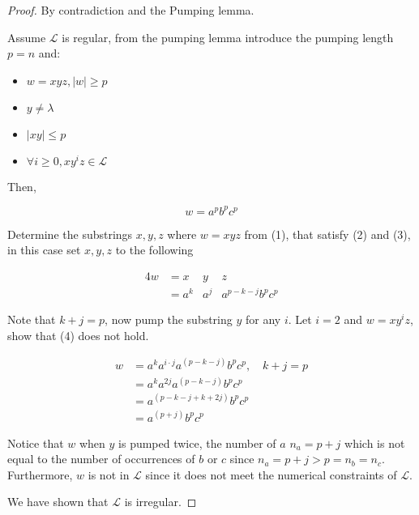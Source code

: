 \begin{proof}
    By contradiction and the Pumping lemma.

    Assume $\mathcal{L}$ is regular, from the pumping lemma introduce the pumping length $p=n$ and:
    \begin{itemize}
        \item $w=xyz, |w| \geq p$
        \item $y\neq \lambda$
        \item $|xy|\leq p$
        \item $\forall i\geq 0, xy^iz\in \mathcal{L}$
    \end{itemize}

    Then,
    
    \[
        w = a^p b^p c^p
    \]

    Determine the substrings $x,y,z$ where $w=xyz$ from (1), that satisfy (2) and (3), in this case set $x,y,z$ to the following
    
    \begin{alignat*}{4}
    w & = x &y & z \\
      & = a^k &a^j & a^{p-k-j}b^pc^p
    \end{alignat*}  


    Note that $k+j = p$, now pump the substring $y$ for any $i$. Let $i = 2$ and $w=xy^iz$, show that (4) does not hold.

    \begin{align*}
    w & = a^k a^{i\cdot j}a^{(p-k-j)}b^pc^p,\quad k+j=p \\
          & = a^k a^{2j}a^{(p-k-j)}b^pc^p \\
          & = a^{(p-k-j+k+2j)}b^pc^p \\
          & = a^{(p+j)}b^pc^p
    \end{align*}

    Notice that $w$ when $y$ is pumped twice, the number of $a$ $n_a=p+j$ which is not equal to the number of occurrences of $b$ or $c$ since $n_a=p+j>p=n_b=n_c$. Furthermore, $w$ is not in $\mathcal{L}$ since it does not meet the numerical constraints of $\mathcal{L}$.

    We have shown that $\mathcal{L}$ is irregular.
    
\end{proof}